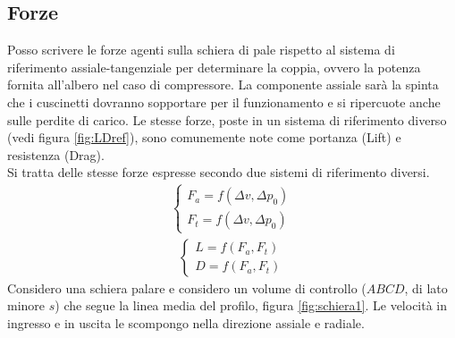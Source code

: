 \subsection{Forze}
Posso scrivere le forze agenti sulla schiera di pale rispetto al sistema di riferimento assiale-tangenziale per determinare la coppia, ovvero la potenza fornita all'albero nel caso di compressore. La componente assiale sarà la spinta che i cuscinetti dovranno sopportare per il funzionamento e si ripercuote anche sulle perdite di carico. Le stesse forze, poste in un sistema di riferimento diverso (vedi figura \ref{fig:LDref}), sono comunemente note come portanza (Lift) e resistenza (Drag).\\
Si tratta delle stesse forze espresse secondo due sistemi di riferimento diversi. 
\begin{align*}
	\begin{cases}
		F_a = f(\Delta v, \Delta p_0)\\
		F_t = f(\Delta v, \Delta p_0)
	\end{cases}
\end{align*}
\begin{align*}
	\begin{cases}
		L = f(F_a,F_t)\\
		D = f(F_a,F_t)
	\end{cases}
\end{align*}
Considero una schiera palare e considero un volume di controllo ($ABCD$, di lato minore $s$) che segue la linea media del profilo, figura \ref{fig:schiera1}. Le velocità in ingresso e in uscita le scompongo nella direzione assiale e radiale. 
